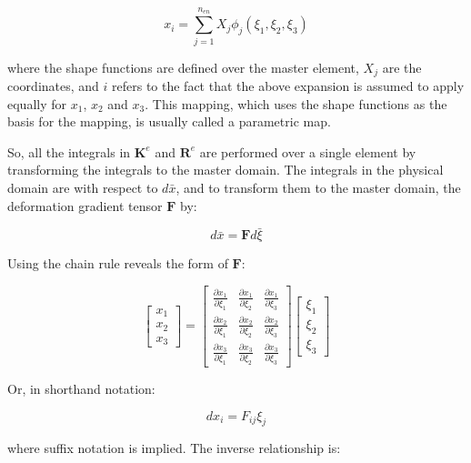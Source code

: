 \documentclass[10pt]{article}
\begin{document}
\begin{equation}
x_i=\sum_{j=1}^{n_{en}}X_j\phi_j(\xi_1,\xi_2,\xi_3)
\end{equation}

where the shape functions are defined over the master element, \(X_j\) are the coordinates, and \(i\) refers to the fact that the above expansion is assumed to apply equally for \(x_1\), \(x_2\) and \(x_3\). This mapping, which uses the shape functions as the basis for the mapping, is usually called a parametric map. 

So, all the integrals in \(\textbf{K}^e\) and \(\textbf{R}^e\) are performed over a single element by transforming the integrals to the master domain. The integrals in the physical domain are with respect to \(d\bar{x}\), and to transform them to the master domain, the deformation gradient tensor \(\textbf{F}\) by:

\begin{equation}
d\bar{x}=\textbf{F}d\bar{\xi}
\end{equation}

Using the chain rule reveals the form of \(\textbf{F}\):

\begin{equation}
\label{eq:FForm}
\begin{bmatrix}x_1\\x_2\\x_3\end{bmatrix}=
\begin{bmatrix}\frac{\partial x_1}{\partial \xi_1}&\frac{\partial x_1}{\partial \xi_2}&\frac{\partial x_1}{\partial \xi_3}\\
\frac{\partial x_2}{\partial \xi_1}&\frac{\partial x_2}{\partial \xi_2}&\frac{\partial x_2}{\partial \xi_3}\\
\frac{\partial x_3}{\partial \xi_1}&\frac{\partial x_3}{\partial \xi_2}&\frac{\partial x_3}{\partial \xi_3}\end{bmatrix}
\begin{bmatrix}\xi_1\\\xi_2\\\xi_3\end{bmatrix}
\end{equation}

Or, in shorthand notation:

\begin{equation}
dx_i=F_{ij}\xi_j
\end{equation}

where suffix notation is implied. The inverse relationship is:
\end{document}

